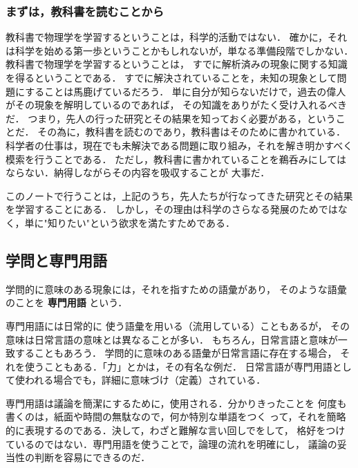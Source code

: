         \subsubsection{まずは，教科書を読むことから}
            教科書で物理学を学習するということは，科学的活動ではない．
            確かに，それは科学を始める第一歩ということかもしれないが，単なる準備段階でしかない．
            教科書で物理学を学習するということは，
            すでに解析済みの現象に関する知識を得るということである．
            すでに解決されていることを，未知の現象として問題にすることは馬鹿げているだろう．
            単に自分が知らないだけで，過去の偉人がその現象を解明しているのであれば，
            その知識をありがたく受け入れるべきだ．
            つまり，先人の行った研究とその結果を知っておく必要がある，ということだ．
            その為に，教科書を読むのであり，教科書はそのために書かれている．
            科学者の仕事は，現在でも未解決である問題に取り組み，それを解き明かすべく模索を行うことである．
            ただし，教科書に書かれていることを鵜呑みにしてはならない．納得しながらその内容を吸収することが
            大事だ．

            このノートで行うことは，上記のうち，先人たちが行なってきた研究とその結果を学習することにある．
            しかし，その理由は科学のさらなる発展のためではなく，単に"知りたい"という欲求を満たすためである．

        \subsection{学問と専門用語}
            学問的に意味のある現象には，それを指すための語彙があり，
            そのような語彙のことを \textbf{専門用語} という．

            専門用語には日常的に
            使う語彙を用いる（流用している）こともあるが，
            その意味は日常言語の意味とは異なることが多い．
            もちろん，日常言語と意味が一致することもあろう．
            学問的に意味のある語彙が日常言語に存在する場合，
            それを使うこともある．「力」とかは，その有名な例だ．
            日常言語が専門用語として使われる場合でも，詳細に意味づけ（定義）されている．

            専門用語は議論を簡潔にするために，使用される．分かりきったことを
            何度も書くのは，紙面や時間の無駄なので，何か特別な単語をつく
            って，それを簡略的に表現するのである．決して，わざと難解な言い回しでをして，
            格好をつけているのではない．専門用語を使うことで，論理の流れを明確にし，
            議論の妥当性の判断を容易にできるのだ．

